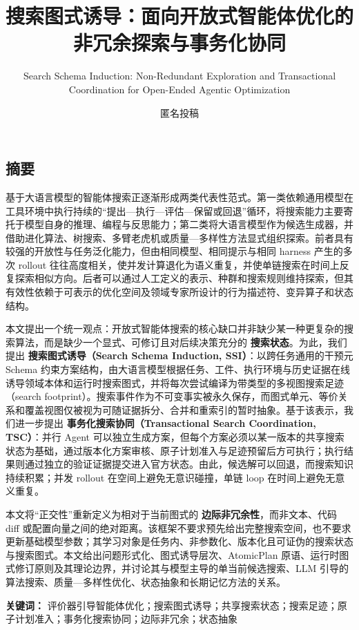 \documentclass[
  11pt]{ctexart}
\title{搜索图式诱导：面向开放式智能体优化的非冗余探索与事务化协同}
\subtitle{Search Schema Induction: Non-Redundant Exploration and
Transactional Coordination for Open-Ended Agentic Optimization}
\author{匿名投稿}
\date{}
\begin{document}
\maketitle

{
\hypersetup{linkcolor=}
\setcounter{tocdepth}{3}
\tableofcontents
}
\subsection{摘要}\label{ux6458ux8981}

基于大语言模型的智能体搜索正逐渐形成两类代表性范式。第一类依赖通用模型在工具环境中执行持续的``提出---执行---评估---保留或回退''循环，将搜索能力主要寄托于模型自身的推理、编程与反思能力；第二类将大语言模型作为候选生成器，并借助进化算法、树搜索、多臂老虎机或质量---多样性方法显式组织探索。前者具有较强的开放性与任务泛化能力，但由相同模型、相同提示与相同
harness 产生的多次 rollout
往往高度相关，使并发计算退化为语义重复，并使单链搜索在时间上反复探索相似方向。后者可以通过人工定义的表示、种群和搜索规则维持探索，但其有效性依赖于可表示的优化空间及领域专家所设计的行为描述符、变异算子和状态结构。

本文提出一个统一观点：开放式智能体搜索的核心缺口并非缺少某一种更复杂的搜索算法，而是缺少一个显式、可修订且对后续决策充分的
\textbf{搜索状态}。为此，我们提出 \textbf{搜索图式诱导（Search Schema
Induction, SSI）}：以跨任务通用的干预元 Schema
约束方案结构，由大语言模型根据任务、工件、执行环境与历史证据在线诱导领域本体和运行时搜索图式，并将每次尝试编译为带类型的多视图搜索足迹（search
footprint）。搜索事件作为不可变事实被永久保存，而图式单元、等价关系和覆盖视图仅被视为可随证据拆分、合并和重索引的暂时抽象。基于该表示，我们进一步提出
\textbf{事务化搜索协同（Transactional Search Coordination, TSC）}：并行
Agent
可以独立生成方案，但每个方案必须以某一版本的共享搜索状态为基础，通过版本化方案审核、原子计划准入与足迹预留后方可执行；执行结果则通过独立的验证证据提交进入官方状态。由此，候选解可以回退，而搜索知识持续积累；并发
rollout 在空间上避免无意识碰撞，单链 loop 在时间上避免无意义重复。

本文将``正交性''重新定义为相对于当前图式的
\textbf{边际非冗余性}，而非文本、代码 diff
或配置向量之间的绝对距离。该框架不要求预先给出完整搜索空间，也不要求更新基础模型参数；其学习对象是任务内、非参数化、版本化且可证伪的搜索状态与搜索图式。本文给出问题形式化、图式诱导层次、AtomicPlan
原语、运行时图式修订原则及其理论边界，并讨论其与模型主导的单当前候选搜索、LLM
引导的算法搜索、质量---多样性优化、状态抽象和长期记忆方法的关系。

\textbf{关键词：}
评价器引导智能体优化；搜索图式诱导；共享搜索状态；搜索足迹；原子计划准入；事务化搜索协同；边际非冗余；状态抽象
\end{document}
